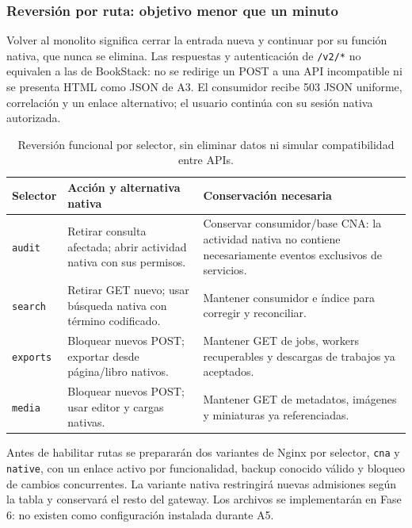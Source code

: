 \clearpage
\subsubsection{Reversión por ruta: objetivo menor que un minuto}

Volver al monolito significa cerrar la entrada nueva y continuar por su
función nativa, que nunca se elimina. Las respuestas y autenticación de
\texttt{/v2/*} no equivalen a las de BookStack: no se redirige un POST a una
API incompatible ni se presenta HTML como JSON de A3. El consumidor recibe
503 JSON uniforme, correlación y un enlace alternativo; el usuario continúa
con su sesión nativa autorizada.

\begin{table}[H]
\centering\small
\begin{tabularx}{\textwidth}{>{\raggedright\arraybackslash}p{2.3cm} X X}
\toprule
\textbf{Selector} & \textbf{Acción y alternativa nativa} & \textbf{Conservación necesaria} \\
\midrule
\texttt{audit} & Retirar consulta afectada; abrir actividad nativa con sus permisos. & Conservar consumidor/base CNA: la actividad nativa no contiene necesariamente eventos exclusivos de servicios. \\
\texttt{search} & Retirar GET nuevo; usar búsqueda nativa con término codificado. & Mantener consumidor e índice para corregir y reconciliar. \\
\texttt{exports} & Bloquear nuevos POST; exportar desde página/libro nativos. & Mantener GET de jobs, workers recuperables y descargas de trabajos ya aceptados. \\
\texttt{media} & Bloquear nuevos POST; usar editor y cargas nativas. & Mantener GET de metadatos, imágenes y miniaturas ya referenciadas. \\
\bottomrule
\end{tabularx}
\caption{Reversión funcional por selector, sin eliminar datos ni simular compatibilidad entre APIs.}
\label{tab:a5-alternativas}
\end{table}

Antes de habilitar rutas se prepararán dos variantes de Nginx por selector,
\texttt{cna} y \texttt{native}, con un enlace activo por funcionalidad,
backup conocido válido y bloqueo de cambios concurrentes. La variante
nativa restringirá nuevas admisiones según la tabla y conservará el resto
del gateway. Los archivos se implementarán en Fase 6: no existen como
configuración instalada durante A5.

